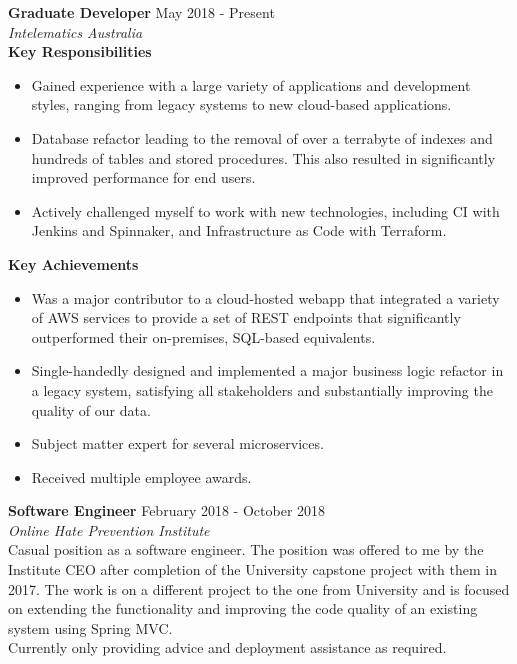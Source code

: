 \documentclass[margin, 11pt]{res} %
\begin{document}
\begin{resume}
\textbf{Graduate Developer} \hfill May 2018 - Present \\
{\sl Intelematics Australia}
\vspace{15pt}\\
\textbf{Key Responsibilities}

\begin{itemize}
\item Gained experience with a large variety of applications and development styles, ranging from legacy systems to new cloud-based applications.
\item Database refactor leading to the removal of over a terrabyte of indexes and hundreds of tables and stored procedures. This also resulted in significantly improved performance for end users.
\item Actively challenged myself to work with new technologies, including CI with Jenkins and Spinnaker, and Infrastructure as Code with Terraform.

\end{itemize} 

\textbf{Key Achievements}

\begin{itemize}

\item Was a major contributor to a cloud-hosted webapp that integrated a variety of AWS services to provide a set of REST endpoints that significantly outperformed their on-premises, SQL-based equivalents.
\item Single-handedly designed and implemented a major business logic refactor in a legacy system, satisfying all stakeholders and substantially improving the quality of our data. 
\item Subject matter expert for several microservices.
\item Received multiple employee awards.


\end{itemize}


\textbf{Software Engineer} \hfill February 2018 - October 2018 \\
{\sl Online Hate Prevention Institute}
\vspace{15pt}\\
Casual position as a software engineer. The position was offered to me by the Institute CEO after completion of the University capstone project with them in 2017. The work is on a different project to the one from University and is focused on extending the functionality and improving the code quality of an existing system using Spring MVC. \\
Currently only providing advice and deployment assistance as required.





\end{resume}
\end{document}
